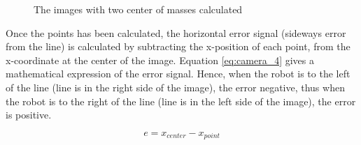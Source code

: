 \begin{figure}[!ht]
	\centering
	\caption{The images with two center of masses calculated}
	\label{fig:camera_7}
\end{figure}

Once the points has been calculated, the horizontal error signal (sideways error from the line) is calculated by subtracting the x-position of each point, from the x-coordinate at the center of the image. Equation \ref{eq:camera_4} gives a mathematical expression of the error signal. Hence, when the robot is to the left of the line (line is in the right side of the image), the error negative, thus when the robot is to the right of the line (line is in the left side of the image), the error is positive.

\begin{equation}\label{eq:camera_4}
	e = x_{center} - x_{point}
\end{equation}





